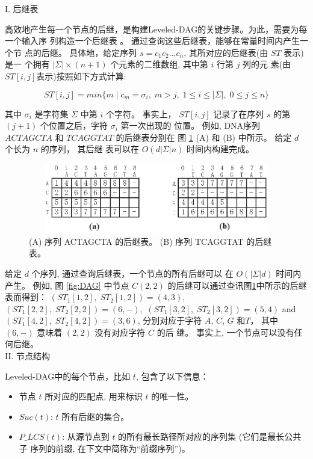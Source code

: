 I. 后继表
\label{sec:successor table}

高效地产生每一个节点的后继，是构建Leveled-DAG的关键步骤。为此，需要为每一个输入序
列构造一个后继表 \cite{Chen2006}。 通过查询这些后继表，能够在常量时间内产生一个节
点的后继。 具体地，给定序列 $s=c_1c_2...c_n$, 其所对应的后继表(由 $ST$ 表示)是一
个拥有 $|\Sigma| \times (n+1)$ 个元素的二维数组, 其中第 $i$ 行第 $j$ 列的元
素(由$ST[i, j]$表示)按照如下方式计算:

$$ST[i,j]=min\{m\;|\;c_m=\sigma_i,\; m > j,\; 1 \leq i \leq
|\Sigma|,\; 0 \leq j \leq n\}$$

其中 $\sigma_i$ 是字符集 $\Sigma$ 中第 $i$ 个字符。 事实上， $ST[i,j]$
记录了在序列 $s$ 的第 $(j+1)$ 个位置之后，字符 $\sigma_i$ 第一次出现的
位置。 例如, DNA序列 $ACTAGCTA$ 和 $TCAGGTAT$ 的后继表分别在
图 \ref{fig:ST} (A) 和 (B) 中所示。 给定 $d$ 个长为 $n$ 的序列， 其后继
表可以在 $O(d|\Sigma|n)$ 时间内构建完成。

\begin{figure}[!h]
  \centering
  \includegraphics[height=1.2in, width=4.8in]{figures/4_MLCS/successor_table}
  \caption{(A) 序列 ACTAGCTA 的后继表。 (B) 序列 TCAGGTAT 的后继表。}
    \label{fig:ST}
  \end{figure}

  给定 $d$ 个序列, 通过查询后继表，一个节点的所有后继可以
  在 $O(|\Sigma|d)$ 时间内产生。 例如, 图 \ref{fig:DAG} 中节点 $C(2,
  2)$ 的后继可以通过查讯图\ref{fig:ST}中所示的后继表而得到：
  $(ST_1[1, 2],\;ST_2[1, 2]) = (4, 3)$,\,
  $(ST_1[2, 2],\;ST_2[2, 2]) = (6, -)$,\,
  $(ST_1[3, 2],\;ST_2[3, 2]) = (5, 4)$ and
  $(ST_1[4, 2],\;ST_2[4, 2]) = (3, 6)$, 分别对应于字符 $A$, $C$,
  $G$ 和$T$， 其中 $(6, -)$ 意味着 $(2, 2)$ 没有对应字符 $C$ 的后
  继。 事实上, 一个节点可以没有任何后继。\\

\noindent II. 节点结构
\label{sec:Node}

Leveled-DAG中的每个节点，比如 $t$, 包含了以下信息：

\begin{itemize}
\item 节点 $t$ 所对应的匹配点, 用来标识 $t$ 的唯一性。
\item $Suc(t)$: $t$ 所有后继的集合。
\item $P\_LCS(t)$: 从源节点到 $t$ 的所有最长路径所对应的序列集 (它们是最长公共子
  序列的前缀, 在下文中简称为“前缀序列”)。
\end{itemize}

